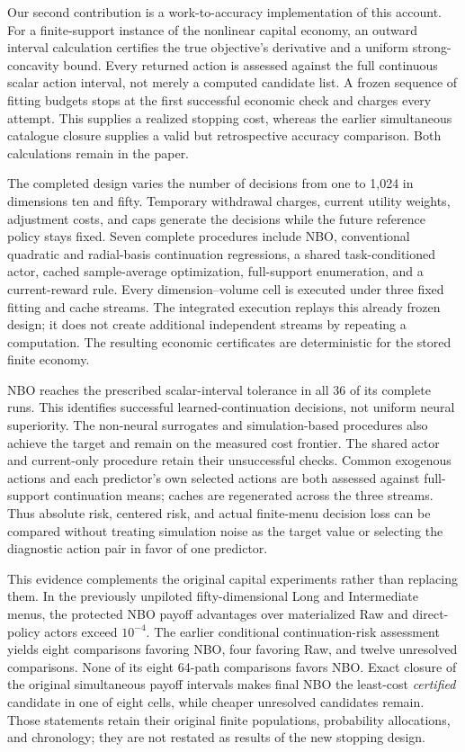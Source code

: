 Our second contribution is a work-to-accuracy implementation of this account.
For a finite-support instance of the nonlinear capital economy, an outward
interval calculation certifies the true objective's derivative and a uniform
strong-concavity bound. Every returned action is assessed against the full
continuous scalar action interval, not merely a computed candidate list.
A frozen sequence of fitting budgets stops at the first successful economic
check and charges every attempt. This supplies a realized stopping cost,
whereas the earlier simultaneous catalogue closure supplies a valid but
retrospective accuracy comparison. Both calculations remain in the paper.

The completed design varies the number of decisions from one to 1,024 in
dimensions ten and fifty. Temporary withdrawal charges, current utility
weights, adjustment costs, and caps generate the decisions while the future
reference policy stays fixed. Seven complete procedures include NBO,
conventional quadratic and radial-basis continuation regressions, a shared
task-conditioned actor, cached sample-average optimization, full-support
enumeration, and a current-reward rule. Every dimension--volume cell is
executed under three fixed fitting and cache streams. The integrated execution
replays this already frozen design; it does not create additional independent
streams by repeating a computation. The resulting economic certificates are
deterministic for the stored finite economy.

NBO reaches the prescribed scalar-interval tolerance in all 36 of its
complete runs. This identifies successful learned-continuation decisions, not
uniform neural superiority. The non-neural surrogates and simulation-based
procedures also achieve the target and remain on the measured cost frontier.
The shared actor and current-only procedure retain their unsuccessful checks.
Common exogenous actions and each predictor's own selected actions are both
assessed against full-support continuation means; caches are regenerated
across the three streams. Thus absolute risk, centered risk, and actual
finite-menu decision loss can be compared without treating simulation noise
as the target value or selecting the diagnostic action pair in favor of one
predictor.

This evidence complements the original capital experiments rather than
replacing them. In the previously unpiloted fifty-dimensional Long and
Intermediate menus, the protected NBO payoff advantages over materialized
Raw and direct-policy actors exceed $10^{-4}$. The earlier conditional
continuation-risk assessment yields eight comparisons favoring NBO, four
favoring Raw, and twelve unresolved comparisons. None of its eight
64-path comparisons favors NBO. Exact closure of the original simultaneous
payoff intervals makes final NBO the least-cost \emph{certified} candidate in
one of eight cells, while cheaper unresolved candidates remain. Those
statements retain their original finite populations, probability allocations,
and chronology; they are not restated as results of the new stopping design.

